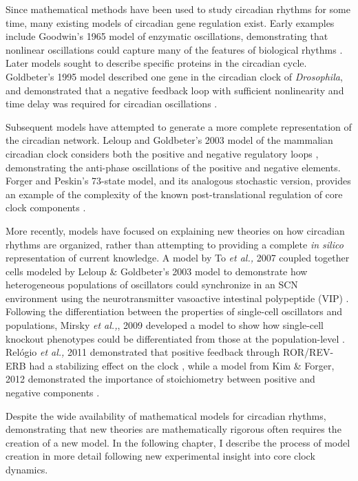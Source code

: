 Since mathematical methods have been used to study circadian rhythms for some time, many existing models of circadian gene regulation exist.
Early examples include Goodwin's 1965 model of enzymatic oscillations, demonstrating that nonlinear oscillations could capture many of the features of biological rhythms \cite{Goodwin1965}. 
Later models sought to describe specific proteins in the circadian cycle. 
Goldbeter's 1995 model described one gene in the circadian clock of {\it Drosophila}, and demonstrated that a negative feedback loop with sufficient nonlinearity and time delay was required for circadian oscillations \cite{Goldbeter1995}.

Subsequent models have attempted to generate a more complete representation of the circadian network. 
Leloup and Goldbeter's 2003 model of the mammalian circadian clock considers both the positive and negative regulatory loops \cite{Leloup2003}, demonstrating the anti-phase oscillations of the positive and negative elements. 
Forger and Peskin's 73-state model, and its analogous stochastic version, provides an example of the complexity of the known post-translational regulation of core clock components \cite{Forger2003,Forger2005}.

More recently, models have focused on explaining new theories on how circadian rhythms are organized, rather than attempting to providing a complete {\itshape in silico} representation of current knowledge.
A model by To {\itshape et al.,} 2007 coupled together cells modeled by Leloup \& Goldbeter's 2003 model to demonstrate how heterogeneous populations of oscillators could synchronize in an SCN environment using the neurotransmitter vasoactive intestinal polypeptide (VIP) \cite{To2007}.
Following the differentiation between the properties of single-cell oscillators and populations, Mirsky {\itshape et al.,}, 2009 developed a model to show how single-cell knockout phenotypes could be differentiated from those at the population-level \cite{Mirsky2009}.
Rel{\'o}gio {\itshape et al.,} 2011 demonstrated that positive feedback through ROR/REV-ERB had a stabilizing effect on the clock \cite{Relogio2011}, while a model from Kim \& Forger, 2012 demonstrated the importance of stoichiometry between positive and negative components \cite{Kim2012}.

Despite the wide availability of mathematical models for circadian rhythms, demonstrating that new theories are mathematically rigorous often requires the creation of a new model. In the following chapter, I describe the process of model creation in more detail following new experimental insight into core clock dynamics.


